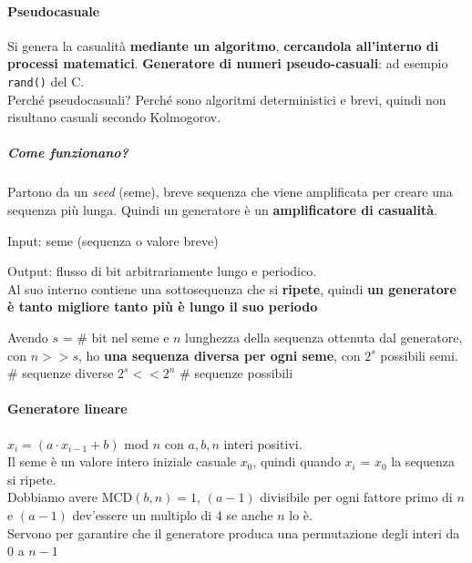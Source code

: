\documentclass[10pt]{book}
\begin{document}
\paragraph{Pseudocasuale} Si genera la casualità \textbf{mediante un algoritmo}, \textbf{cercandola all'interno di processi matematici}. \textbf{Generatore di numeri pseudo-casuali}: ad esempio \texttt{rand()} del C.\\
Perché pseudocasuali? Perché sono algoritmi deterministici e brevi, quindi non risultano casuali secondo Kolmogorov.
\subparagraph{Come funzionano?} Partono da un \textit{seed} (seme), breve sequenza che viene amplificata per creare una sequenza più lunga. Quindi un generatore è un \textbf{amplificatore di casualità}.
\begin{list}{}{}
	\item Input: seme (sequenza o valore breve)
	\item Output: flusso di bit arbitrariamente lungo e periodico.\\
	Al suo interno contiene una sottosequenza che si \textbf{ripete}, quindi \textbf{un generatore è tanto migliore tanto più è lungo il suo periodo}
	\item Avendo $s$ = \# bit nel seme e $n$ lunghezza della sequenza ottenuta dal generatore, con $n >> s$, ho \textbf{una sequenza diversa per ogni seme}, con $2^s$ possibili semi.
	\\\# sequenze diverse $2^s << 2^n$ \# sequenze possibili
\end{list}
\paragraph{Generatore lineare} $x_i = (a\cdot x_{i-1} + b)$ mod $n$ con $a,b,n$ interi positivi.\\
Il seme è un valore intero iniziale casuale $x_0$, quindi quando $x_i$ = $x_0$ la sequenza si ripete.\\
Dobbiamo avere MCD$(b,n)=1$, $(a-1)$ divisibile per ogni fattore primo di $n$ e $(a-1)$ dev'essere un multiplo di 4 se anche $n$ lo è.\\
Servono per garantire che il generatore produca una permutazione degli interi da 0 a $n-1$
\end{document}
